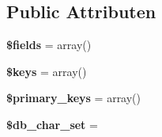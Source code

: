 \subsection*{Public Attributen}
\begin{DoxyCompactItemize}
\item 
\mbox{\label{class_c_i___d_b__forge_ab2303c817e3b402b77b7f99627b9c319}} 
{\bfseries \$fields} = array()
\item 
\mbox{\label{class_c_i___d_b__forge_af20635b6c08e03bfee9e3fc036fa80f3}} 
{\bfseries \$keys} = array()
\item 
\mbox{\label{class_c_i___d_b__forge_a09349689030ba7198a094abf357c78bc}} 
{\bfseries \$primary\+\_\+keys} = array()
\item 
\mbox{\label{class_c_i___d_b__forge_a6e90c3633cd0984a7e8de501f7771c53}} 
{\bfseries \$db\+\_\+char\+\_\+set} = \textquotesingle{}\textquotesingle{}
\end{DoxyCompactItemize}
